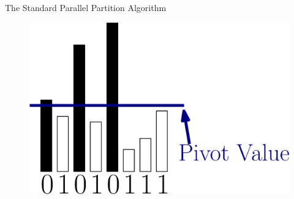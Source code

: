 \documentclass[xcolor=x11names, svgnames, rgb]{beamer}
\begin{document}
\begin{frame}[t]{The Standard Parallel Partition Algorithm }
	\begin{figure}
		\includegraphics[width=\linewidth]{imgs/standardAlg/standardAlg1.eps}
	\end{figure}
\end{frame}
\end{document}
